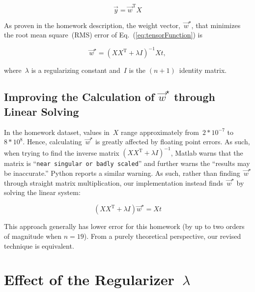 \documentclass{report}
\newcommand{\eref}[1]{(\ref{#1})}
\newcommand{\wstar}{\vec{w}^{\star}}
\begin{document}
  \begin{equation}
    \vec{y}=\vec{w}^{\text{T}}X
  \end{equation}\label{eq:tensorFunction}
  
  \noindent
  As proven in the homework description, the weight vector,~$\wstar$, that minimizes the root mean square~(RMS) error of Eq.~\eref{eq:tensorFunction} is
  
  \begin{equation}
    \wstar=(XX^{\text{T}} + \lambda I)^{-1}Xt,
  \end{equation}\label{eq:wstarDef}
  
  \noindent
  where~$\lambda$ is a regularizing constant and~$I$ is the $(n+1)$~identity matrix.
  
  \subsection{Improving the Calculation of $\wstar$ through Linear Solving}
  
  In the homework dataset, values in~$X$ range approximately from~${2*10^{-7}}$ to~${8*10^{8}}$.  Hence, calculating~$\wstar$ is greatly affected by floating point errors.  As such, when trying to find the inverse matrix ${(XX^{\text{T}} + \lambda I)^{-1}}$, Matlab warns that the matrix is ``\texttt{near singular or badly scaled}''  and further warns the ``results may be inaccurate.''  Python reports a similar warning.  As such, rather than finding~$\wstar$ through straight matrix multiplication, our implementation instead finds~$\wstar$ by solving the linear system:
    
  \begin{equation}
    (XX^{\text{T}} + \lambda I)\wstar=Xt
  \end{equation}
  
  \noindent
  This approach generally has lower error for this homework (by up to two orders of magnitude when $n=19$).  From a purely theoretical perspective, our revised technique is equivalent.
      
  \section{Effect of the Regularizer~$\lambda$}
  
\end{document}
